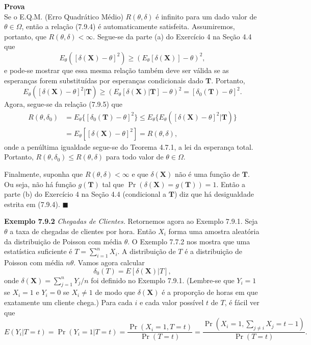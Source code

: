 \noindent\textbf{Prova} \\
Se o E.Q.M. (Erro Quadrático Médio) $R(\theta, \delta)$ é infinito para um dado valor de $\theta \in \Omega$, então a relação (7.9.4) é automaticamente satisfeita. Assumiremos, portanto, que $R(\theta, \delta) < \infty$. Segue-se da parte (a) do Exercício 4 na Seção 4.4 que
\[
E_\theta([\delta(\mathbf{X}) - \theta]^2) \ge (E_\theta[\delta(\mathbf{X})] - \theta)^2,
\]
e pode-se mostrar que essa mesma relação também deve ser válida se as esperanças forem substituídas por esperanças condicionais dado $\mathbf{T}$. Portanto,
\begin{equation}
E_\theta([\delta(\mathbf{X}) - \theta]^2|\mathbf{T}) \ge (E_\theta[\delta(\mathbf{X})|\mathbf{T}] - \theta)^2 = [\delta_0(\mathbf{T}) - \theta]^2. \tag{7.9.5}
\end{equation}
Agora, segue-se da relação (7.9.5) que
\begin{align*}
R(\theta, \delta_0) &= E_\theta\{[\delta_0(\mathbf{T}) - \theta]^2\} \le E_\theta\{E_\theta([\delta(\mathbf{X}) - \theta]^2|\mathbf{T})\} \\
&= E_\theta[[\delta(\mathbf{X}) - \theta]^2] = R(\theta, \delta),
\end{align*}
onde a penúltima igualdade segue-se do Teorema 4.7.1, a lei da esperança total. Portanto, $R(\theta, \delta_0) \le R(\theta, \delta)$ para todo valor de $\theta \in \Omega$.

Finalmente, suponha que $R(\theta, \delta) < \infty$ e que $\delta(\mathbf{X})$ não é uma função de $\mathbf{T}$. Ou seja, não há função $g(\mathbf{T})$ tal que $\Pr(\delta(\mathbf{X}) = g(\mathbf{T}))=1$. Então a parte (b) do Exercício 4 na Seção 4.4 (condicional a $\mathbf{T}$) diz que há desigualdade estrita em (7.9.4). \hfill $\blacksquare$


\noindent\textbf{Exemplo 7.9.2} \quad \textit{Chegadas de Clientes.} Retornemos agora ao Exemplo 7.9.1. Seja $\theta$ a taxa de chegadas de clientes por hora. Então $X_i$ forma uma amostra aleatória da distribuição de Poisson com média $\theta$. O Exemplo 7.7.2 nos mostra que uma estatística suficiente é $T = \sum_{i=1}^{n} X_i$. A distribuição de $T$ é a distribuição de Poisson com média $n\theta$. Vamos agora calcular
\[ \delta_0(T) = E[\delta(\mathbf{X})|T], \]
onde $\delta(\mathbf{X})=\sum_{j=1}^{n} Y_j/n$ foi definido no Exemplo 7.9.1. (Lembre-se que $Y_i=1$ se $X_i=1$ e $Y_i=0$ se $X_i \neq 1$ de modo que $\delta(\mathbf{X})$ é a proporção de horas em que exatamente um cliente chega.) Para cada $i$ e cada valor possível $t$ de $T$, é fácil ver que
\[ E(Y_i|T=t) = \Pr(Y_i=1|T=t) = \frac{\Pr(X_i=1, T=t)}{\Pr(T=t)} = \frac{\Pr(X_i=1, \sum_{j \neq i} X_j=t-1)}{\Pr(T=t)}. \]

